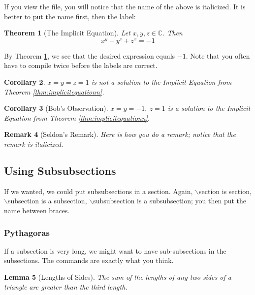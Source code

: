 \documentclass[12pt,reqno]{amsart}
\newtheorem{thm}{Theorem}[section]
\newtheorem{cor}[thm]{Corollary}
\newtheorem{lem}[thm]{Lemma}
\newtheorem{rek}[thm]{Remark}
\newcommand{\C}{\ensuremath{\mathbb{C}}}
\numberwithin{equation}{section}
\begin{document}
If you view the file, you will notice that the name of the above
is italicized. It is better to put the name first, then the label:

\begin{thm}[The Implicit Equation]\label{thm:implicitequation} Let
$x, y, z \in \C$. Then
\begin{equation}
x^y + y^z + z^x = -1
\end{equation}
\end{thm}

By Theorem \ref{thm:implicitequation}, we see that the desired
expression equals $-1$. Note that you often have to compile twice
before the labels are correct.

\begin{cor}
$x = y = z = 1$ is not a solution to the Implicit Equation from
Theorem \ref{thm:implicitequationn}.
\end{cor}

\begin{cor}[Bob's Observation]
$x = y = -1, \ z = 1$ is a solution to the Implicit Equation from
Theorem \ref{thm:implicitequationn}.
\end{cor}

\begin{rek}[Seldon's Remark] Here is how you do a remark; notice
that the remark is italicized. \end{rek}

\subsection{Using Subsubsections}

If we wanted, we could put subsubsections in a section. Again,
$\backslash$section is section, $\backslash$subsection is a
subsection, $\backslash$subsubsection is a subsubsection; you then
put the name between braces.

\subsubsection{Pythagoras}

If a subsection is very long, we might want to have
sub-subsections in the subsections. The commands are exactly what
you think.

\begin{lem}[Lengths of Sides]
The sum of the lengths of any two sides of a triangle are greater
than the third length.
\end{lem}
\end{document}
